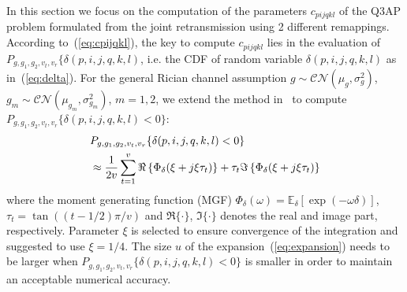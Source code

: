 \documentclass[conference]{IEEEtran}
\begin{document}
In this section we focus on the computation of the parameters $c_{pijqkl}$
of the Q3AP problem formulated from the joint retransmission using 2 different
remappings. According to~(\ref{eq:cpijqkl}), the key to compute $c_{pijqkl}$ lies in the evaluation of $P_{g,g_1,g_2,v_t,v_r}\{\delta(p,i,j,q,k,l)$, i.e.
the CDF of random variable $\delta(p,i,j,q,k,l)$ as in~(\ref{eq:delta}). For the
general Rician channel assumption
$g\sim\mathcal{CN}(\mu_{g},\sigma_{g}^2)$,
$g_m\sim\mathcal{CN}(\mu_{g_m},\sigma_{g_m}^2)$, $m=1, 2$, we extend the method
in~\cite{harvind2005symbol, taricco2002exact} to compute
$P_{g,g_1,g_2,v_t,v_r}\{\delta(p,i,j,q,k,l) < 0\}$:
\begin{align}
    & P_{g,g_1,g_2,v_t,v_r}\{\delta(p,i,j,q,k,l) < 0\} \notag \\
    & \approx \frac{1}{2v}\sum_{t=1}^v \Re\left\{\Phi_{\delta}(\xi +
    j\xi\tau_t)\right\} + \tau_t\Im\left\{\Phi_{\delta}(\xi +
    j\xi\tau_t)\right\}
    \label{eq:expansion}
\end{align}
where the moment generating function (MGF) $\Phi_{\delta}(\omega) =
\mathbb{E}_{\delta}[\exp(-\omega\delta)]$, $\tau_t = \tan((t - 1/2)\pi/v)$
and $\Re\{\cdot\}$, $\Im\{\cdot\}$ denotes the real and image part,
respectively. Parameter $\xi$ is selected to ensure convergence of the
integration and \cite{taricco2002exact} suggested to use $\xi = 1/4$. The size
$u$ of the expansion~(\ref{eq:expansion}) needs to be larger when $
P_{g,g_1,g_2,v_t,v_r}\{\delta(p,i,j,q,k,l) < 0\}$ is smaller in order to
maintain an acceptable numerical accuracy.
\end{document}
